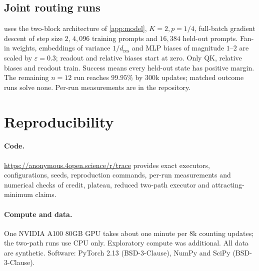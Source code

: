 \subsection{Joint routing runs}
\label{app:reach}

 uses the two-block architecture of \cref{app:model}, $K=2,p=1/4$,
full-batch gradient descent of step size $2$, $4{,}096$ training prompts and $16{,}384$
held-out prompts. Fan-in weights, embeddings of variance $1/d_{\mathrm{res}}$ and
MLP biases of magnitude $1$--$2$ are scaled by $\varepsilon=0.3$; readout and relative
biases start at zero. Only QK, relative biases and readout train. Success means every
held-out state has positive margin. The remaining $n=12$ run reaches $99.95\%$ by
$300$k updates; matched outcome runs solve none. Per-run measurements are in the repository.

\section{Reproducibility}
\label{app:reproducibility}

\paragraph{Code.} \url{https://anonymous.4open.science/r/trace} provides exact executors,
configurations, seeds, reproduction commands, per-run measurements and numerical checks
of credit, plateau, reduced two-path executor and attracting-minimum claims.

\paragraph{Compute and data.} One NVIDIA A100 80GB GPU takes about one minute per $8$k
counting updates; the two-path runs use CPU only. Exploratory compute was additional. All data are synthetic.
Software: PyTorch 2.13 (BSD-3-Clause), NumPy and SciPy (BSD-3-Clause).
